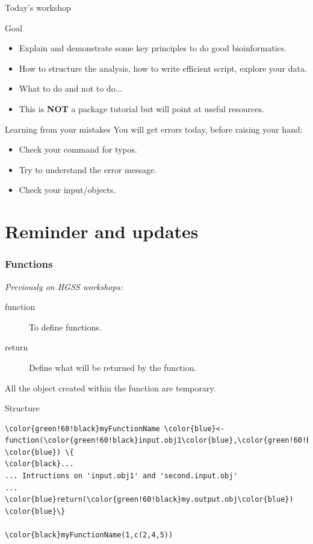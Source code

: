 \documentclass[10pt]{beamer}
\newenvironment{xframe}[2][]
  {\begin{frame}[fragile,environment=xframe,#1]
  \frametitle{#2}}
  {\end{frame}}
\begin{document}
\begin{frame}[label=handout]{Today's workshop}
  \begin{block}{Goal}
    \begin{itemize}
    \item Explain and demonstrate some key principles to do good bioinformatics.
    \item How to structure the analysis, how to write efficient script, explore your data. 
    \item What to do and not to do...
      \bigskip
    \item This is {\bf NOT} a package tutorial but will point at useful resources.
    \end{itemize}    
  \end{block}
  \medskip

  \begin{block}{Learning from your mistakes}
    You will get errors today, before raising your hand:
    \begin{itemize}
    \item Check your command for typos.
    \item Try to understand the error message.
    \item Check your input/objects. 
    \end{itemize}    
  \end{block}
\end{frame}




\section{Reminder and updates}

\begin{xframe}{Functions}
  {\it\small Previously on HGSS workshops: }
  \begin{block}{}
    \begin{description}
      \item[function] To define functions.
      \item[return] Define what will be returned by the function. 
    \end{description}
    All the object created within the function are temporary.
    \bigskip
    \end{block}
    \begin{block}{Structure}    
\begin{Verbatim}[commandchars=\\\{\}]
\color{green!60!black}myFunctionName \color{blue}<- function(\color{green!60!black}input.obj1\color{blue},\color{green!60!black}second.input.obj \color{blue}) \{
\color{black}...
... Intructions on 'input.obj1' and 'second.input.obj'
...
\color{blue}return(\color{green!60!black}my.output.obj\color{blue})
\color{blue}\}

\color{black}myFunctionName(1,c(2,4,5))
\end{Verbatim}
  \end{block}
\end{xframe}
\end{document}
